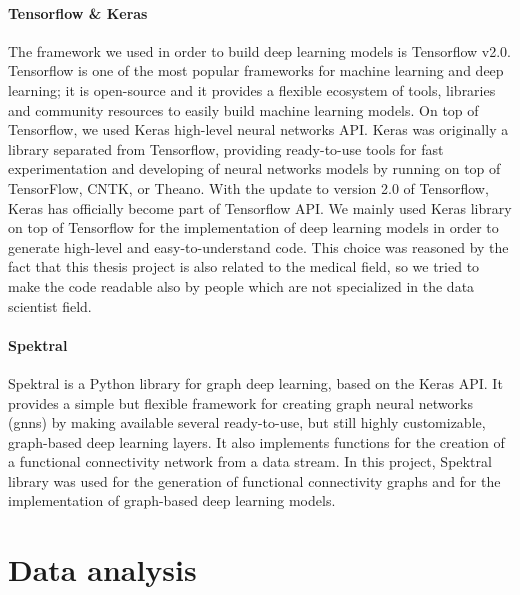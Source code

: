 \paragraph{Tensorflow \& Keras} \cite{tensorflow} \cite{keras} The framework we used in order to build deep learning models is Tensorflow v2.0. Tensorflow is one of the most popular frameworks for machine learning and deep learning; it is open-source and it provides a flexible ecosystem of tools, libraries and community resources to easily build machine learning models. On top of Tensorflow, we used Keras high-level neural networks API. Keras was originally a library separated from Tensorflow, providing ready-to-use tools for fast experimentation and developing of neural networks models by running on top of TensorFlow, CNTK, or Theano. With the update to version 2.0 of Tensorflow, Keras has officially become part of Tensorflow API. We mainly used Keras library on top of Tensorflow for the implementation of deep learning models in order to generate high-level and easy-to-understand code. This choice was reasoned by the fact that this thesis project is also related to the medical field, so we tried to make the code readable also by people which are not specialized in the data scientist field.

\paragraph{Spektral} \cite{Spektral} Spektral is a Python library for graph deep learning, based on the Keras API. It provides a simple but flexible framework for creating graph neural networks (\acsp{gnn}) by making available several ready-to-use, but still highly customizable, graph-based deep learning layers. It also implements functions for the creation of a functional connectivity network from a data stream. In this project, Spektral library was used for the generation of functional connectivity graphs and for the implementation of graph-based deep learning models.



\section{Data analysis} \label{sec: data_analysis}



